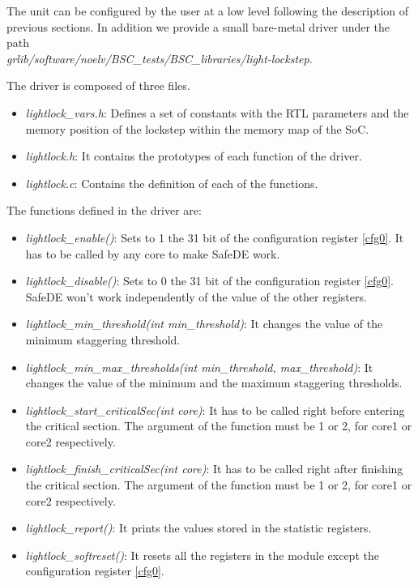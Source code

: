 The unit can be configured by the user at a low level following the description of previous sections. In addition we provide a small bare-metal driver under the path \\ \textit{grlib/software/noelv/BSC\_tests/BSC\_libraries/light-lockstep}.

The driver is composed of three files.
\begin{itemize}
\item \textit{lightlock\_vars.h}: Defines a set of constants with the RTL parameters and the memory position of the lockstep within the memory map of the SoC.
\item \textit{lightlock.h}: It contains the prototypes of each function of the driver.
\item \textit{lightlock.c}: Contains the definition of each of the functions.
\end{itemize}

The functions defined in the driver are: 
\begin{itemize}
\item \textit{lightlock\_enable()}: Sets to 1 the 31 bit of the configuration register \ref{cfg0}. It has to be called by any core to make SafeDE work.
\item \textit{lightlock\_disable()}: Sets to 0 the 31 bit of the configuration register \ref{cfg0}. SafeDE won't work independently of the value of the other registers. 
\item \textit{lightlock\_min\_threshold(int min\_threshold)}: It changes the value of the minimum staggering threshold. 
\item \textit{lightlock\_min\_max\_thresholds(int min\_threshold, max\_threshold)}: It changes the value of the minimum and the maximum staggering thresholds.
\item \textit{lightlock\_start\_criticalSec(int core)}: It has to be called right before entering the critical section. The argument of the function must be 1 or 2, for core1 or core2 respectively.
\item \textit{lightlock\_finish\_criticalSec(int core)}: It has to be called right after finishing the critical section. The argument of the function must be 1 or 2, for core1 or core2 respectively.
\item \textit{lightlock\_report()}: It prints the values stored in the statistic registers.
\item \textit{lightlock\_softreset()}: It resets all the registers in the module except the configuration register \ref{cfg0}.
\end{itemize}


\hspace{2cm}
